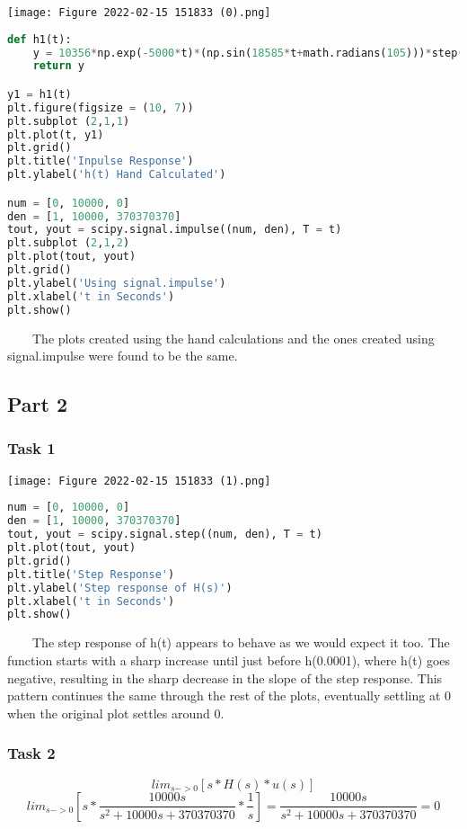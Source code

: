 \documentclass[11pt,a4]{article}
\begin{document}
\texttt{[image: Figure 2022-02-15 151833 (0).png]}

\begin{lstlisting}[language=Python]
def h1(t):
    y = 10356*np.exp(-5000*t)*(np.sin(18585*t+math.radians(105)))*step(t)
    return y

y1 = h1(t)
plt.figure(figsize = (10, 7))
plt.subplot (2,1,1)
plt.plot(t, y1)
plt.grid()
plt.title('Inpulse Response')
plt.ylabel('h(t) Hand Calculated')

num = [0, 10000, 0]
den = [1, 10000, 370370370]
tout, yout = scipy.signal.impulse((num, den), T = t)
plt.subplot (2,1,2)
plt.plot(tout, yout)
plt.grid()
plt.ylabel('Using signal.impulse')
plt.xlabel('t in Seconds')
plt.show()
\end{lstlisting}

\ \ \ \ The plots created using the hand calculations and the ones created using signal.impulse were found to be the same. 

\subsection{Part 2}

\subsubsection{Task 1}

\texttt{[image: Figure 2022-02-15 151833 (1).png]}

\begin{lstlisting}[language=Python]
num = [0, 10000, 0]
den = [1, 10000, 370370370]
tout, yout = scipy.signal.step((num, den), T = t)
plt.plot(tout, yout)
plt.grid()
plt.title('Step Response')
plt.ylabel('Step response of H(s)')
plt.xlabel('t in Seconds')
plt.show()
\end{lstlisting}

\ \ \ \ The step response of h(t) appears to behave as we would expect it too. The function starts with a sharp increase until just before h(0.0001), where h(t) goes negative, resulting in the sharp decrease in the slope of the step response. This pattern continues the same through the rest of the plots, eventually settling at 0 when the original plot settles around 0.

\subsubsection{Task 2}

$$lim_{s->0}[s*H(s)*u(s)]$$
$$lim_{s->0}[s*\frac{10000s}{s^2+10000s+370370370}*\frac{1}{s}] = \frac{10000s}{s^2+10000s+370370370} = 0$$
\end{document}
